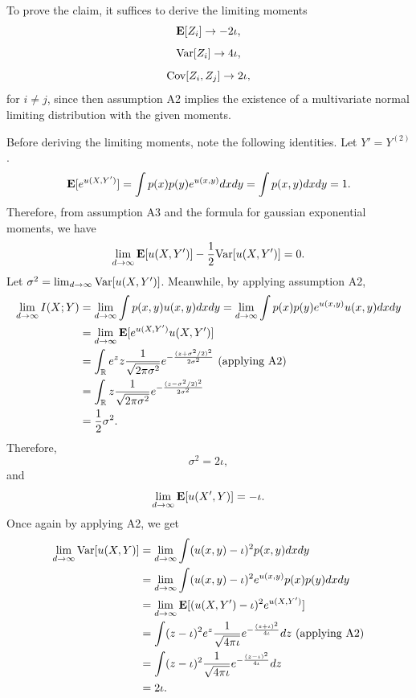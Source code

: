To prove the claim, it suffices to derive the limiting moments
\[\textbf{E}[Z_i] \to -2\iota,\]
\[\text{Var}[Z_i] \to 4\iota,\]
\[\text{Cov}[Z_i, Z_j] \to 2\iota,\]
for $i \neq j$,
since then assumption A2 implies the existence of a multivariate normal
limiting distribution with the given moments.

Before deriving the limiting moments, note the following identities.
Let $Y' = Y^{(2)}$.
\[
\textbf{E}[e^{u(X, Y')}] = \int p(x) p(y) e^{u(x, y)} dx dy = \int p(x, y) dx dy = 1.
\]
Therefore, from assumption A3 and the formula for gaussian exponential
moments, we have
\[
\lim_{d \to \infty} \textbf{E}[u(X, Y')]-\frac{1}{2}\text{Var}[u(X, Y')] = 0.
\]
Let $\sigma^2 = \lim_{d \to \infty} \text{Var}[u(X, Y')]$.
Meanwhile, by applying assumption A2,
\begin{align*}
\lim_{d \to \infty} I(X; Y) &= \lim_{d \to \infty} \int p(x, y) u(x, y) dx dy 
= \lim_{d \to \infty} \int p(x) p(y) e^{u(x, y)} u(x, y) dx dy
\\&= \lim_{d \to \infty}  \textbf{E}[e^{u(X, Y')}u(X, Y')]
\\&= \int_{\mathbb{R}} e^z z \frac{1}{\sqrt{2\pi \sigma^2}} 
e^{-\frac{(z + \sigma^2/2)^2}{2\sigma^2}} \text{ (applying A2)}
\\&= \int_{\mathbb{R}} z \frac{1}{\sqrt{2\pi \sigma^2}} 
e^{-\frac{(z - \sigma^2/2)^2}{2\sigma^2}}
\\&= \frac{1}{2}\sigma^2.
\end{align*}
Therefore,
\[
\sigma^2 = 2\iota,
\]
and
\[
\lim_{d \to \infty} \textbf{E}[u(X', Y)] = -\iota.
\]
Once again by applying A2, we get
\begin{align*}
\lim_{d \to \infty} \text{Var}[u(X, Y)] 
&= \lim_{d \to \infty} \int (u(x, y) - \iota)^2 p(x, y) dx dy
\\&= \lim_{d \to \infty} \int (u(x, y) - \iota)^2 e^{u(x, y)} p(x) p(y) dx dy
\\&= \lim_{d \to \infty} \textbf{E}[(u(X, Y') - \iota)^2 e^{u(X, Y')}] 
\\&= \int (z - \iota)^2 e^z \frac{1}{\sqrt{4\pi\iota}} e^{-\frac{(z+\iota)^2}{4\iota}} dz \text{ (applying A2)}
\\&= \int (z - \iota)^2 \frac{1}{\sqrt{4\pi\iota}} e^{-\frac{(z-\iota)^2}{4\iota}} dz
\\&= 2\iota.
\end{align*}



